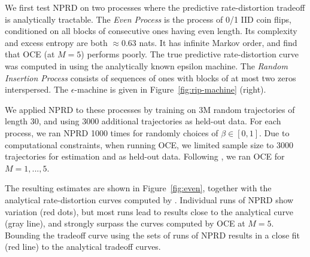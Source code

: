 \documentclass[11pt,letterpaper]{article}
\begin{document}
We first test NPRD on two processes where the predictive rate-distortion tradeoff is analytically tractable. %
The \emph{Even Process} \citep{marzen-predictive-2016} is the process of 0/1 IID coin flips, conditioned on all blocks of consecutive ones having even length.
Its complexity and excess entropy are both $\approx 0.63$ nats. %
It has infinite Markov order, and \cite{marzen-predictive-2016} find that OCE (at $M=5$) performs poorly. %
The true predictive rate-distortion curve was computed in \cite{marzen-predictive-2016} using the analytically known epsilon machine.
The \emph{Random Insertion Process} \citep{marzen-predictive-2016} consists of sequences of ones with blocks of at most two zeros interspersed.
The $\epsilon$-machine is given in Figure~\ref{fig:rip-machine} (right).

We applied NPRD to these processes by training on 3M random trajectories of length 30, and using 3000 additional trajectories as held-out data.
For each process, we ran NPRD 1000 times for randomly choices of $\beta \in [0,1]$.
Due to computational constraints, when running OCE, we limited sample size to 3000 trajectories for estimation and as held-out data.
Following \cite{marzen-predictive-2016}, we ran OCE for $M=1,...,5$.

The resulting estimates are shown in Figure~\ref{fig:even}, together with the analytical rate-distortion curves computed by \cite{marzen-predictive-2016}.
Individual runs of NPRD show variation (red dots), but most runs lead to results close to the analytical curve (gray line), and strongly surpass the curves computed by OCE at $M=5$.
Bounding the tradeoff curve using the sets of runs of NPRD results in a close fit (red line) to the analytical tradeoff curves.
\end{document}
